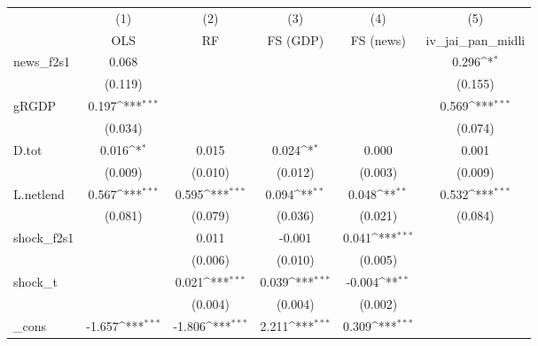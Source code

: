 {
\def\sym#1{\ifmmode^{#1}\else\(^{#1}\)\fi}
\begin{tabular}{l*{5}{c}}
\toprule
            &\multicolumn{1}{c}{(1)}&\multicolumn{1}{c}{(2)}&\multicolumn{1}{c}{(3)}&\multicolumn{1}{c}{(4)}&\multicolumn{1}{c}{(5)}\\
            &\multicolumn{1}{c}{OLS}&\multicolumn{1}{c}{RF}&\multicolumn{1}{c}{FS (GDP)}&\multicolumn{1}{c}{FS (news)}&\multicolumn{1}{c}{iv\_jai\_pan\_midli}\\
\midrule
news\_f2s1   &       0.068         &                     &                     &                     &       0.296\sym{*}  \\
            &     (0.119)         &                     &                     &                     &     (0.155)         \\
\addlinespace
gRGDP       &       0.197\sym{***}&                     &                     &                     &       0.569\sym{***}\\
            &     (0.034)         &                     &                     &                     &     (0.074)         \\
\addlinespace
D.tot       &       0.016\sym{*}  &       0.015         &       0.024\sym{*}  &       0.000         &       0.001         \\
            &     (0.009)         &     (0.010)         &     (0.012)         &     (0.003)         &     (0.009)         \\
\addlinespace
L.netlend   &       0.567\sym{***}&       0.595\sym{***}&       0.094\sym{**} &       0.048\sym{**} &       0.532\sym{***}\\
            &     (0.081)         &     (0.079)         &     (0.036)         &     (0.021)         &     (0.084)         \\
\addlinespace
shock\_f2s1  &                     &       0.011         &      -0.001         &       0.041\sym{***}&                     \\
            &                     &     (0.006)         &     (0.010)         &     (0.005)         &                     \\
\addlinespace
shock\_t     &                     &       0.021\sym{***}&       0.039\sym{***}&      -0.004\sym{**} &                     \\
            &                     &     (0.004)         &     (0.004)         &     (0.002)         &                     \\
\addlinespace
\_cons      &      -1.657\sym{***}&      -1.806\sym{***}&       2.211\sym{***}&       0.309\sym{***}&                     \\

\end{tabular}}
